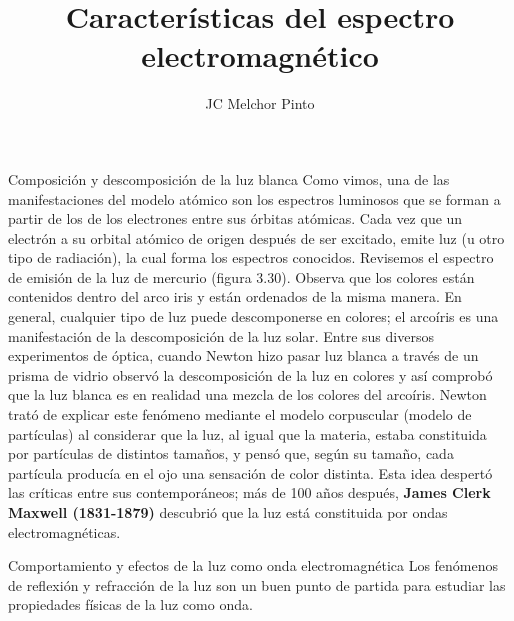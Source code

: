 \documentclass[12pt,addpoints,answers]{guia}
\title{Características del espectro electromagnético}
\author{JC Melchor Pinto}
\begin{document}
\INFO%
\begin{multicols}{2}%
    
    
\end{multicols}%
\ejemplosboxed[]%
\begin{questions}
    \questionboxed[30]{}
    \questionboxed[30]{}
    \questionboxed[30]{}
    \questionboxed[25]{}
    \questionboxed[25]{}
    \begin{sectionbox}{Composición y descomposición de la luz blanca}
        Como vimos, una de las manifestaciones del modelo atómico son los espectros luminosos que se forman a partir de los  de los electrones entre sus órbitas atómicas.
        Cada vez que un electrón  a
        su orbital atómico de origen después
        de ser excitado, emite luz (u otro tipo
        de radiación), la cual forma los espectros conocidos. Revisemos el espectro
        de emisión de la luz de mercurio (figura 3.30).
        Observa que los colores están contenidos dentro del arco iris y están ordenados de
        la misma manera. En general, cualquier tipo de luz puede descomponerse en colores;
        el arcoíris es una manifestación de la descomposición de la luz solar. Entre sus diversos experimentos de óptica, cuando Newton hizo pasar luz blanca a través de un prisma de vidrio observó la descomposición de la luz en colores y así comprobó que la
        luz blanca es en realidad una mezcla de los colores del arcoíris. Newton trató de explicar este fenómeno mediante el modelo corpuscular (modelo de partículas) al considerar que la luz, al igual que la materia, estaba constituida por partículas de distintos
        tamaños, y pensó que, según su tamaño, cada partícula producía en el ojo una sensación de color distinta. Esta idea despertó las críticas entre sus contemporáneos; más
        de 100 años después, \textbf{James Clerk Maxwell (1831-1879)} descubrió que la luz está
        constituida por ondas electromagnéticas.
    \end{sectionbox}

    \begin{sectionbox}{Comportamiento y efectos de la luz como onda electromagnética}
        Los fenómenos de reflexión y refracción de la luz son un buen punto de partida para
        estudiar las propiedades físicas de la luz como onda.


\end{sectionbox}
\end{questions}
\end{document}
